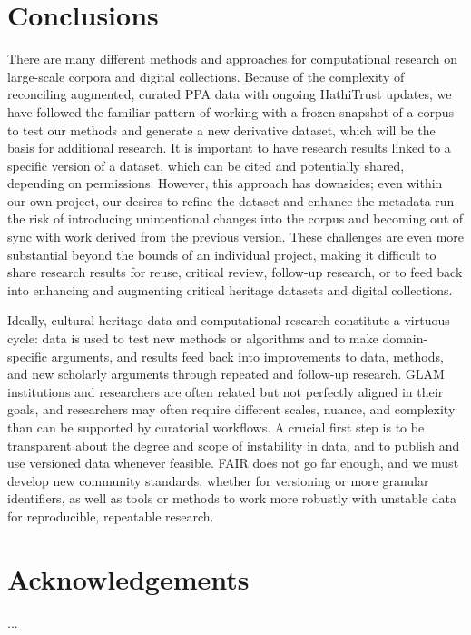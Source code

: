 \documentclass[final]{anthology-ch} %
\begin{document}
\section{Conclusions}

There are many different methods and approaches for computational research on large-scale corpora and digital collections. Because of the complexity of reconciling augmented, curated PPA data with ongoing HathiTrust updates, we have followed the familiar pattern of working with a frozen snapshot of a corpus to test our methods and generate a new derivative dataset, which will be the basis for additional research. It is important to have research results linked to a specific version of a dataset, which can be cited and potentially shared, depending on permissions. However, this approach has downsides; even within our own project, our desires to refine the dataset and enhance the metadata run the risk of introducing unintentional changes into the corpus and becoming out of sync with work derived from the previous version. These challenges are even more substantial beyond the bounds of an individual project, making it difficult to share research results for reuse, critical review, follow-up research, or to feed back into enhancing and augmenting critical heritage datasets and digital collections. 

Ideally, cultural heritage data and computational research constitute a virtuous cycle: data is used to test new methods or algorithms and to make domain-specific arguments, and results feed back into improvements to data, methods, and new scholarly arguments through repeated and follow-up research. GLAM institutions and researchers are often related but not perfectly aligned in their goals, and researchers may often require different scales, nuance, and complexity than can be supported by curatorial workflows. A crucial first step is to be transparent about the degree and scope of instability in data, and to publish and use versioned data whenever feasible. FAIR does not go far enough, and we must develop new community standards, whether for versioning or more granular identifiers, as well as tools or methods to work more robustly with unstable data for reproducible, repeatable research.  

\section*{Acknowledgements}

...
\end{document}
